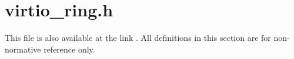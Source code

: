 \chapter{virtio_ring.h}\label{sec:virtio-ring.h}

This file is also available at the link
\virtiourlh.
All definitions in this section are for non-normative reference
only.


